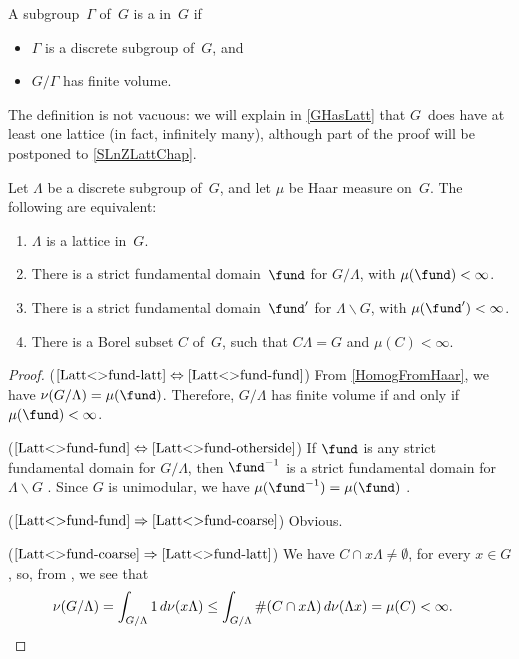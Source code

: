 \begin{defn} \label{LatticeDefn}
 A subgroup~$\Gamma$ of~$G$ is a
 in~$G$ if
 \begin{itemize}
 \item $\Gamma$ is a discrete subgroup of~$G$, and
 \item $G/\Gamma$ has finite volume.
 \end{itemize}
 \end{defn}

\begin{rem}
The definition is not vacuous: we will explain in \cref{GHasLatt} that $G$~does have at least one lattice (in fact, infinitely many), although part of the proof will be postponed to \cref{SLnZLattChap}.
\end{rem}

\begin{prop} \label{Latt<>fund}
 Let $\Lambda$ be a discrete subgroup of~$G$, and let
$\mu$ be Haar measure on~$G$. The following are equivalent:
 \begin{enumerate}
 \item \label{Latt<>fund-latt}
 $\Lambda$ is a lattice in~$G$.
 \item \label{Latt<>fund-fund}
 There is a strict fundamental domain~$\fund$ for $G/\Lambda$, with $\mu(\fund) < \infty$.
 \item \label{Latt<>fund-otherside}
 There is a strict fundamental domain~$\fund'$ for $\Lambda \backslash G$, with $\mu(\fund') < \infty$.
 \item \label{Latt<>fund-coarse}
 There is a Borel subset $C$ of~$G$, such that $C \Lambda = G$ and $\mu(C) < \infty$.
 \end{enumerate}
 \end{prop}

\begin{proof}
 ($\ref{Latt<>fund-latt} \Leftrightarrow
\ref{Latt<>fund-fund}$) From \cref{HomogFromHaar}, we
have $\nu(G/\Lambda) = \mu(\fund)$. Therefore,
$G/\Lambda$ has finite volume if and only if
$\mu(\fund) < \infty$.

($\ref{Latt<>fund-fund} \Leftrightarrow \ref{Latt<>fund-otherside}$)
If $\fund$ is any strict fundamental domain for $G/\Lambda$, then $\fund^{-1}$ is a strict fundamental domain for $\Lambda \backslash G$ . 
Since $G$ is unimodular, we have $\mu(\fund^{-1}) = \mu(\fund)$ . 

 ($\ref{Latt<>fund-fund} \Rightarrow
\ref{Latt<>fund-coarse}$) Obvious.

 ($\ref{Latt<>fund-coarse} \Rightarrow
\ref{Latt<>fund-latt}$) We have $C \cap x \Lambda \neq
\emptyset$, for every $x \in G$, so, from
, we see that
 \begin{align*} \nu(G/\Lambda) 
 = \int_{G/\Lambda} 1 \, d\nu(x \Lambda)
 \le \int_{G/\Lambda} \#(C \cap x \Lambda) \,
d\nu(\Lambda x)
 = \mu(C)
 < \infty 
 . & \qedhere \end{align*}
 \end{proof}

